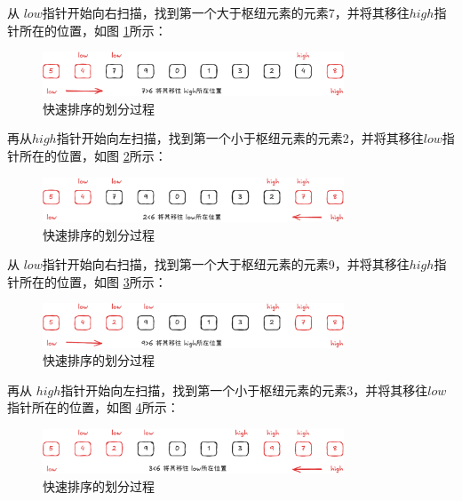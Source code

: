 \documentclass[lang=cn,newtx,10pt,scheme=chinese]{elegantbook}
\begin{document}
从 $low$指针开始向右扫描，找到第一个大于枢纽元素的元素7，并将其移往$high$指针所在的位置，如图 \ref{fig:patition_d}所示：

\begin{figure}
[h!]
    \centering
    \includegraphics[width=0.8\textwidth]{./figure/pdf/cropped/patition_d.pdf}
    \caption{快速排序的划分过程}
    \label{fig:patition_d}
\end{figure}

再从$high$指针开始向左扫描，找到第一个小于枢纽元素的元素2，并将其移往$low$指针所在的位置，如图 \ref{fig:patition_e}所示：

\begin{figure}
[h!]
    \centering
    \includegraphics[width=0.8\textwidth]{./figure/pdf/cropped/patition_e.pdf}
    \caption{快速排序的划分过程}
    \label{fig:patition_e}
\end{figure}

从 $low$指针开始向右扫描，找到第一个大于枢纽元素的元素9，并将其移往$high$指针所在的位置，如图 \ref{fig:patition_f}所示：

\begin{figure}
[h!]
    \centering
    \includegraphics[width=0.8\textwidth]{./figure/pdf/cropped/patition_f.pdf}
    \caption{快速排序的划分过程}
    \label{fig:patition_f}
\end{figure}

再从 $high$指针开始向左扫描，找到第一个小于枢纽元素的元素3，并将其移往$low$指针所在的位置，如图 \ref{fig:patition_g}所示：

\begin{figure}
[h!]
    \centering
    \includegraphics[width=0.8\textwidth]{./figure/pdf/cropped/patition_g.pdf}
    \caption{快速排序的划分过程}
    \label{fig:patition_g}
\end{figure}
\end{document}
